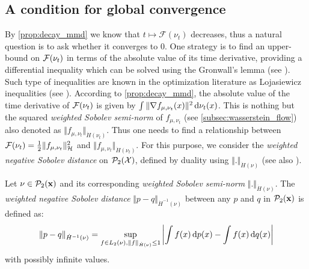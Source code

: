 \subsection{A condition for global convergence}\label{sec:Lojasiewicz_inequality}
By \cref{prop:decay_mmd} we know that $t\mapsto\mathcal{F}(\nu_t)$ decreases, thus a natural question is to ask whether it converges to $0$. One strategy is to find an upper-bound on ${{\mathcal F}}(\nu_t)$ in terms of the absolute value of its time derivative, providing a differential inequality which can be solved using the Gronwall's lemma (see \cite{oguntuase2001inequality}). Such type of inequalities are known in the optimization literature as Lojasiewicz inequalities (see \cite{Bolte:2016}).
According to \cref{prop:decay_mmd}, the absolute value of the time derivative of ${{\mathcal F}}(\nu_t)$ is given by $\int \Vert \nabla f_{\mu,\nu_t}(x) \Vert^2 \mathop{}\!\mathrm{d} \nu_t(x)$. This is nothing but the squared \textit{weighted Sobolev semi-norm} of $f_{\mu,\nu_t}$ (see \cref{subsec:wasserstein_flow}) also denoted as $\Vert f_{\mu,\nu_t} \Vert_{\dot{H}(\nu_t)}$. Thus one needs to find a relationship between ${{\mathcal F}}(\nu_t) = \frac{1}{2} \Vert f_{\mu,\nu_t} \Vert_{\mathcal{H}}^2 $ and $\Vert f_{\mu,\nu_t} \Vert_{\dot{H}(\nu_t)}$. For this purpose, we consider the \textit{weighted negative Sobolev distance} on $\mathcal{P}_2({{\mathcal X}})$, defined by duality using $\Vert . \Vert_{\dot{H}(\nu)}$ (see also \cite{Peyre:2011}).
\begin{definition}\label{def:neg_sobolev}
	Let $\nu\in \mathcal{P}_2({\mathbf x})$ and its corresponding \textit{weighted Sobolev semi-norm} $ \Vert . \Vert_{\dot{H}(\nu)} $. %
	The \textit{weighted negative Sobolev distance} $\Vert p - q \Vert_{\dot{H}^{-1}(\nu)}$ between any $p$ and $q$ in $\mathcal{P}_2({\mathbf x})$  is defined as:
\begin{align}\label{eq:neg_sobolev}
	\Vert p - q \Vert_{\dot{H}^{-1}(\nu)} = \sup_{f\in L_2(\nu), \Vert f \Vert_{\dot{H}(\nu)} \leq 1 } \left\vert \int f(x)\mathop{}\!\mathrm{d} p(x) - \int f(x)\mathop{}\!\mathrm{d} q(x) \right\vert 
\end{align}	
with possibly infinite values.
\end{definition}
